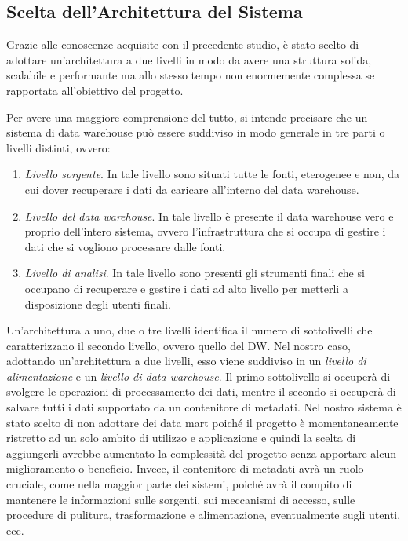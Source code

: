 \subsection{Scelta dell'Architettura del Sistema}

Grazie alle conoscenze acquisite con il precedente studio, è stato scelto di adottare un'architettura a due livelli in modo da avere una struttura solida, scalabile e performante ma allo stesso tempo non enormemente complessa se rapportata all'obiettivo del progetto.

Per avere una maggiore comprensione del tutto, si intende precisare che un sistema di data warehouse può essere suddiviso in modo generale in tre parti o livelli distinti, ovvero:

\begin{enumerate}
    \item \textit{Livello sorgente}. In tale livello sono situati tutte le fonti, eterogenee e non, da cui dover recuperare i dati da caricare all'interno del data warehouse.
    \item \textit{Livello del data warehouse}. In tale livello è presente il data warehouse vero e proprio dell'intero sistema, ovvero l'infrastruttura che si occupa di gestire i dati che si vogliono processare dalle fonti.
    \item \textit{Livello di analisi}. In tale livello sono presenti gli strumenti finali che si occupano di recuperare e gestire i dati ad alto livello per metterli a disposizione degli utenti finali.
\end{enumerate}

Un'architettura a uno, due o tre livelli identifica il numero di sottolivelli che caratterizzano il secondo livello, ovvero quello del DW. Nel nostro caso, adottando un'architettura a due livelli, esso viene suddiviso in un \textit{livello di alimentazione} e un \textit{livello di data warehouse}. Il primo sottolivello si occuperà di svolgere le operazioni di processamento dei dati, mentre il secondo si occuperà di salvare tutti i dati supportato da un contenitore di metadati. Nel nostro sistema è stato scelto di non adottare dei data mart poiché il progetto è momentaneamente ristretto ad un solo ambito di utilizzo e applicazione e quindi la scelta di aggiungerli avrebbe aumentato la complessità del progetto senza apportare alcun miglioramento o beneficio. Invece, il contenitore di metadati avrà un ruolo cruciale, come nella maggior parte dei sistemi, poiché avrà il compito di mantenere le informazioni sulle sorgenti, sui meccanismi di accesso, sulle procedure di pulitura, trasformazione e alimentazione, eventualmente sugli utenti, ecc.

